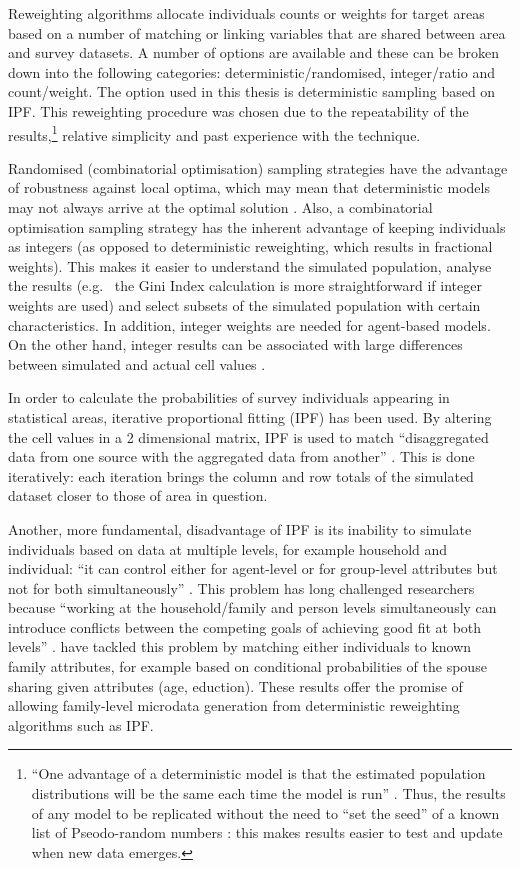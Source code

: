Reweighting algorithms allocate individuals counts or weights for target
areas based on a number of matching or linking variables that are shared between
area and survey datasets. A number of options are available and these can be
broken down into the following categories:
deterministic/randomised, integer/ratio and count/weight.
The option used in this thesis is deterministic
sampling based on IPF. This reweighting procedure was
chosen due to the repeatability of the
results,\footnote{``One
advantage of a deterministic model is that the estimated population
distributions will be the same each time the model is run'' \citep{Smith2009}⁠.
Thus, the results of any model to be replicated
without the need to ``set the seed'' of a known list of
Pseodo-random numbers \citep{Robert2009}: this makes results easier to
test and update when new data emerges.}
relative simplicity and past experience with
the technique.

Randomised (combinatorial optimisation) sampling strategies have the advantage
of robustness against local
optima, which may mean that deterministic models may not always arrive at the
optimal solution \citep{Williamson1998}.
Also, a combinatorial optimisation sampling strategy has the inherent advantage of
keeping individuals as integers (as opposed to deterministic reweighting,
which results in fractional weights). This makes it easier to
understand the simulated population, analyse the results 
(e.g.~ the Gini Index calculation
is more straightforward if integer weights are used) and select
subsets of the simulated population with certain characteristics.
In addition, integer weights are needed for agent-based models. On the other
hand, integer results can be associated with large differences between simulated
and actual cell values \citep{Ballas2005}⁠.

In order to calculate the probabilities of survey individuals appearing in
statistical areas, iterative proportional fitting (IPF) has been used. By
altering the cell values in a 2 dimensional matrix, IPF is used to match
``disaggregated data from one source with the aggregated data from another''
\citep[p.~1]{Norman1999a}⁠. This is done iteratively: each iteration brings the column and
row totals of the simulated dataset closer to those of area in question.

Another, more fundamental, disadvantage of IPF is its inability to simulate
individuals based on data at multiple levels, for example household and
individual: ``it can control either for agent-level or for group-level
attributes but not for both simultaneously'' \citep[p.~5]{Muller2010}.
This problem has long challenged researchers because ``working at the
household/family and person levels simultaneously can introduce conflicts
between the competing goals of achieving good fit at both levels''
\citet[p.~694]{Pritchard2012}. \citet{Pritchard2012} have tackled this problem
by matching either individuals to known family attributes, for example 
based on conditional probabilities of the spouse sharing given
attributes (age, eduction). These results offer the promise of allowing
family-level microdata generation from deterministic reweighting algorithms
such as IPF.

